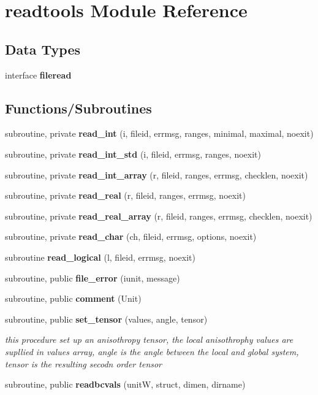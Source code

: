 \section{readtools Module Reference}
\label{namespacereadtools}
\subsection*{Data Types}
\begin{DoxyCompactItemize}
\item 
interface {\bf fileread}
\end{DoxyCompactItemize}
\subsection*{Functions/\+Subroutines}
\begin{DoxyCompactItemize}
\item 
subroutine, private {\bf read\+\_\+int} (i, fileid, errmsg, ranges, minimal, maximal, noexit)
\item 
subroutine, private {\bf read\+\_\+int\+\_\+std} (i, fileid, errmsg, ranges, noexit)
\item 
subroutine, private {\bf read\+\_\+int\+\_\+array} (r, fileid, ranges, errmsg, checklen, noexit)
\item 
subroutine, private {\bf read\+\_\+real} (r, fileid, ranges, errmsg, noexit)
\item 
subroutine, private {\bf read\+\_\+real\+\_\+array} (r, fileid, ranges, errmsg, checklen, noexit)
\item 
subroutine, private {\bf read\+\_\+char} (ch, fileid, errmsg, options, noexit)
\item 
subroutine {\bf read\+\_\+logical} (l, fileid, errmsg, noexit)
\item 
subroutine, public {\bf file\+\_\+error} (iunit, message)
\item 
subroutine, public {\bf comment} (Unit)
\item 
subroutine, public {\bf set\+\_\+tensor} (values, angle, tensor)
\begin{DoxyCompactList}\small\item\em this procedure set up an anisothropy tensor, the local anisothrophy values are supllied in values array, angle is the angle between the local and global system, tensor is the resulting secodn order tensor \end{DoxyCompactList}\item 
subroutine, public {\bf readbcvals} (unitW, struct, dimen, dirname)
\end{DoxyCompactItemize}


